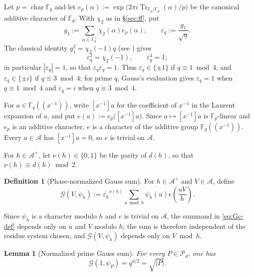 \documentclass[a4paper,reqno]{amsart}
\numberwithin{equation}{section}
\newtheorem{lemma}[theorem]{Lemma}
\theoremstyle{remark}
\theoremstyle{definition}
\newtheorem{definition}[theorem]{Definition}
\newcommand{\A}{\mathcal{A}}
\newcommand{\epsq}{\varepsilon_q}
\newcommand{\Gc}{\mathcal{G}}
\begin{document}
Let $p=\operatorname{char}\mathbb F_q$ and let
$e_p(\alpha):=\exp\bigl(2\pi i\operatorname{Tr}_{\mathbb F_q/\mathbb F_p}(\alpha)/p\bigr)$
be the canonical additive character of $\mathbb F_q$. With $\chi_2$ as in
\S\ref{sec:ff}, put
\begin{equation}\label{eq:g1-def}
g_1:=\sum_{\alpha\in\mathbb F_q^\times}\chi_2(\alpha)e_p(\alpha),
\qquad
\epsq:=\frac{g_1}{\sqrt q}.
\end{equation}
The classical identity $g_1^2=\chi_2(-1)q$
(see \cite[Chapter~10, Section~3]{IR90}) gives
\begin{equation}\label{eq:epsq}
\epsq^2=\chi_2(-1), \qquad \epsq^4=1;
\end{equation}
in particular $|\epsq|=1$, so that $\epsq\overline{\epsq}=1$.
Thus $\epsq\in\{\pm1\}$ if $q\equiv1\bmod4$, and $\epsq\in\{\pm i\}$ if
$q\equiv3\bmod4$; for prime $q$, Gauss's evaluation gives $\epsq=1$ when
$q\equiv1\bmod4$ and $\epsq=i$ when $q\equiv3\bmod4$.

For $a\in\mathbb F_q((x^{-1}))$, write $[x^{-1}]a$ for the coefficient of
$x^{-1}$ in the Laurent expansion of $a$, and put
$e(a):=e_p\bigl([x^{-1}]a\bigr)$. Since $a\mapsto[x^{-1}]a$ is
$\mathbb F_p$-linear and $e_p$ is an additive character, $e$ is a character
of the additive group $\mathbb F_q((x^{-1}))$. Every $a\in\A$ has
$[x^{-1}]a=0$, so $e$ is trivial on $\A$.


For $h\in\A^+$, let $\nu(h)\in\{0,1\}$ be the parity of $d(h)$, so that
$\nu(h)\equiv d(h)\bmod2$.

\begin{definition}[Phase-normalized Gauss sum]
For $h\in\A^+$ and $V\in\A$, define
\begin{equation}\label{eq:Gc-def}
\Gc(V,\psi_h)
:=\overline{\epsq}^{\,\nu(h)}
\sum_{u\bmod h}\psi_h(u)e\!\left(\frac{uV}{h}\right).
\end{equation}
\end{definition}

Since $\psi_h$ is a character modulo $h$ and $e$ is trivial on $\A$, the
summand in \eqref{eq:Gc-def} depends only on $u$ and $V$ modulo $h$; the sum
is therefore independent of the residue system chosen, and $\Gc(V,\psi_h)$
depends only on $V\bmod h$.

\begin{lemma}[Normalized prime Gauss sum]\label{lem:prime-gauss}
For every $P\in\mathcal{P}_{d}$, one has
\begin{equation}\label{eq:prime-gauss}
\Gc(1,\psi_P)=q^{d/2}=\sqrt{|P|}.
\end{equation}
\end{lemma}
\end{document}
